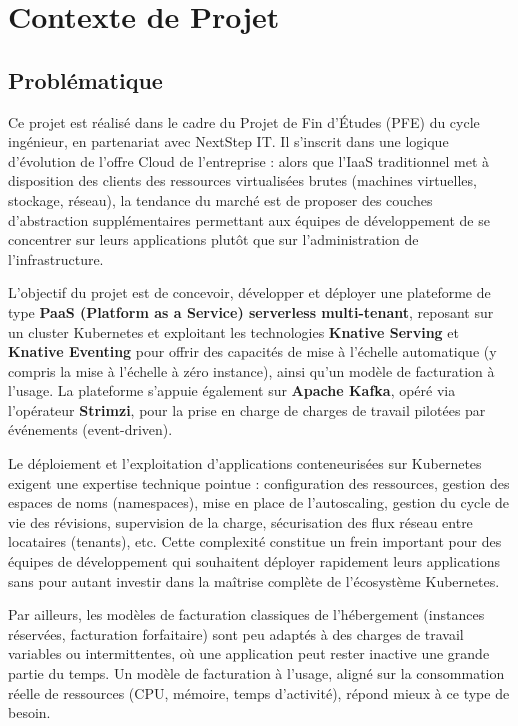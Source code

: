 \section{Contexte de Projet}

\subsection{Problématique}

Ce projet est réalisé dans le cadre du Projet de Fin d'Études (PFE) du cycle ingénieur, en partenariat avec NextStep IT. Il s'inscrit dans une logique d'évolution de l'offre Cloud de l'entreprise : alors que l'IaaS traditionnel met à disposition des clients des ressources virtualisées brutes (machines virtuelles, stockage, réseau), la tendance du marché est de proposer des couches d'abstraction supplémentaires permettant aux équipes de développement de se concentrer sur leurs applications plutôt que sur l'administration de l'infrastructure.

L'objectif du projet est de concevoir, développer et déployer une plateforme de type \textbf{PaaS (Platform as a Service) serverless multi-tenant}, reposant sur un cluster Kubernetes et exploitant les technologies \textbf{Knative Serving} et \textbf{Knative Eventing} pour offrir des capacités de mise à l'échelle automatique (y compris la mise à l'échelle à zéro instance), ainsi qu'un modèle de facturation à l'usage. La plateforme s'appuie également sur \textbf{Apache Kafka}, opéré via l'opérateur \textbf{Strimzi}, pour la prise en charge de charges de travail pilotées par événements (event-driven).

Le déploiement et l'exploitation d'applications conteneurisées sur Kubernetes exigent une expertise technique pointue : configuration des ressources, gestion des espaces de noms (namespaces), mise en place de l'autoscaling, gestion du cycle de vie des révisions, supervision de la charge, sécurisation des flux réseau entre locataires (tenants), etc. Cette complexité constitue un frein important pour des équipes de développement qui souhaitent déployer rapidement leurs applications sans pour autant investir dans la maîtrise complète de l'écosystème Kubernetes.

Par ailleurs, les modèles de facturation classiques de l'hébergement (instances réservées, facturation forfaitaire) sont peu adaptés à des charges de travail variables ou intermittentes, où une application peut rester inactive une grande partie du temps. Un modèle de facturation à l'usage, aligné sur la consommation réelle de ressources (CPU, mémoire, temps d'activité), répond mieux à ce type de besoin.

